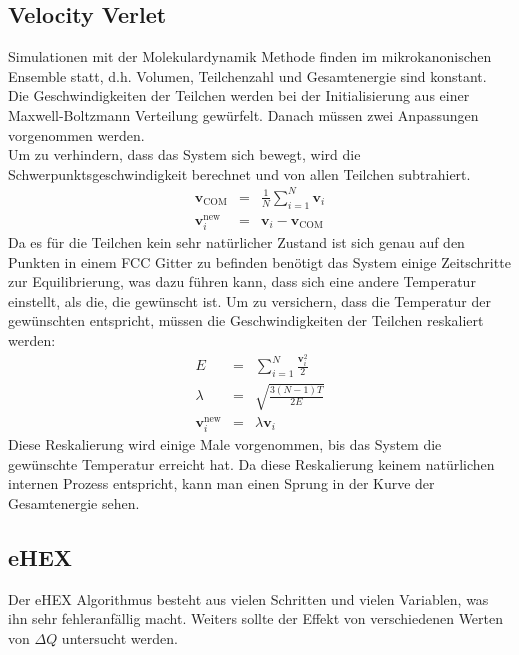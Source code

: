 \documentclass[12pt]{article}
\begin{document}
\subsection{Velocity Verlet}
Simulationen mit der Molekulardynamik Methode finden im mikrokanonischen Ensemble statt, d.h. Volumen, Teilchenzahl und Gesamtenergie sind konstant.
Die Geschwindigkeiten der Teilchen werden bei der Initialisierung aus einer Maxwell-Boltzmann Verteilung gewürfelt. Danach müssen zwei Anpassungen 
vorgenommen werden.\\
Um zu verhindern, dass das System sich bewegt, wird die Schwerpunktsgeschwindigkeit berechnet und von allen Teilchen subtrahiert.
\begin{eqnarray}
    \mathbf{v}_\text{COM} &=& \frac1N\sum_{i=1}^N \mathbf{v}_i\\
    \mathbf{v}_i^\text{new} &=& \mathbf{v}_i - \mathbf{v}_\text{COM}
\end{eqnarray}
Da es für die Teilchen kein sehr natürlicher Zustand ist sich genau auf den Punkten in einem FCC Gitter zu befinden benötigt das System 
einige Zeitschritte zur Equilibrierung, was dazu führen kann, dass sich eine andere Temperatur einstellt, als die, die gewünscht ist. Um zu 
versichern, dass die Temperatur der gewünschten entspricht, müssen die Geschwindigkeiten der Teilchen reskaliert werden:
\begin{eqnarray}
\label{eq:rescale1}   E &=& \sum_{i=1}^N \frac{\mathbf{v}_i^2}{2} \\
 \label{eq:rescale2}   \lambda &=& \sqrt{\frac{3(N-1)T}{2E}} \\
 \label{eq:rescale3}   \mathbf{v}_i^\text{new} &=& \lambda \mathbf{v}_i  
\end{eqnarray}
Diese Reskalierung wird einige Male vorgenommen, bis das System die gewünschte Temperatur erreicht hat. Da diese Reskalierung keinem 
natürlichen internen Prozess entspricht, kann man einen Sprung in der Kurve der Gesamtenergie sehen.

\subsection{eHEX}
Der eHEX Algorithmus besteht aus vielen Schritten und vielen Variablen, was ihn sehr fehleranfällig macht. Weiters sollte der Effekt von 
verschiedenen Werten von $\Delta Q$ untersucht werden. 
\end{document}
